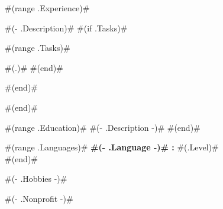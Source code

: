 \documentclass[10pt]{developercv} %
\begin{document}

\begin{entrylist}
	#(range .Experience)#
	{ #(- .Description)# 
	#(if .Tasks)#\begin{compactitem}
		#(range .Tasks)# \item #(.)#
		#(end)#\end{compactitem}
	#(end)# }
#(end)#
\end{entrylist}


\begin{entrylist}
	#(range .Education)#
	{ #(- .Description -)# }
#(end)#
\end{entrylist}


\begin{minipage}[t]{0.3\textwidth}
	\vspace{-\baselineskip} %

	#(range .Languages)#\textbf{ #(- .Language -)# :} #(.Level)# \\
	#(end)#
\end{minipage}
\hfill
\begin{minipage}[t]{0.3\textwidth}
	\vspace{-\baselineskip} %
	
	#(- .Hobbies -)#
\end{minipage}
\hfill
\begin{minipage}[t]{0.3\textwidth}
	\vspace{-\baselineskip} %
	
	#(- .Nonprofit -)#
	
\end{minipage}

\end{document}
